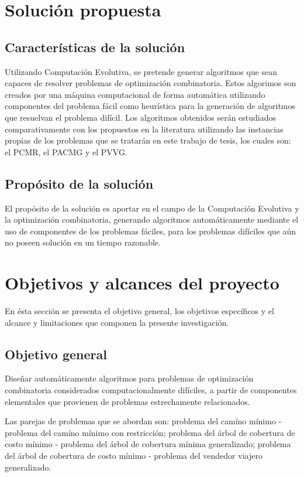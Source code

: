 \section{Solución propuesta}
\label{intro:solucion}


\subsection{Características de la solución}

Utilizando Computación Evolutiva, se pretende generar algoritmos que sean capaces de resolver problemas de optimización combinatoria. Estos algorimos son creados por una máquina computacional de forma automática utilizando componentes del problema fácil como heurística para la generación de algoritmos que resuelvan el problema difícil. Los algoritmos obtenidos serán estudiados comparativamente con los propuestos en la literatura utilizando las instancias propias de los problemas
que se tratarán en este trabajo de tesis, los cuales son: el PCMR, el PACMG y el PVVG.

\subsection{Propósito de la solución}

El propósito de la solución es aportar en el campo de la Computación Evolutiva y la optimización combinatoria, generando algoritmos automáticamente mediante el uso de componentes de los problemas fáciles, para los problemas difíciles que aún no poseen solución en un tiempo razonable.


\section{Objetivos y alcances del proyecto}
\label{intro:objetivos}
En ésta sección se presenta el objetivo general, los objetivos específicos y el alcance y limitaciones que componen la presente investigación.

\subsection{Objetivo general}

Diseñar automáticamente algoritmos para problemas de optimización combinatoria considerados computacionalmente difíciles, a partir de componentes elementales que provienen de problemas estrechamente relacionados.

Las parejas de problemas que se abordan son: problema del camíno mínimo - problema del camíno mínimo con restricción; problema del árbol de cobertura de costo mínimo - problema del árbol de cobertura mínima generalizado; problema del árbol de cobertura de costo mínimo - problema del vendedor viajero generalizado.

